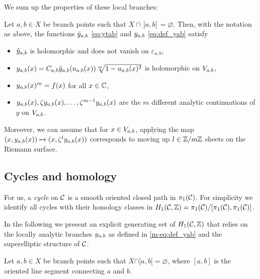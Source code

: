 \documentclass[main.tex]{subfiles}
\begin{document}
We sum up the properties of these local branches:

 \begin{prop}\label{prop:yab}
      Let $a,b\in X$ be branch points such that $X\cap\,]a,b[\,=\varnothing$.
      Then, with the notation as above, the functions
      $\tilde{y}_{a,b}$ \eqref{eq:ytab} and $y_{a,b}$ \eqref{eq:def_yab}
      satisfy
     \begin{itemize}
         \item $\tilde{y}_{a,b}$ is holomorphic and does not vanish on $ε_{a,b}$,
         \item $y_{a,b}(x) = C_{a,b} \tilde{y}_{a,b}(u_{a,b}(x)) \sqrt[m]{1-u_{a,b}(x)^2}$ is holomorphic
         on $V_{a,b}$,
         \item $y_{a,b}(x)^m = f(x)$ for all $x\in\mathbb{C}$,
         \item $y_{a,b}(x),\zeta y_{a,b}(x),\dots,\zeta^{m-1}y_{a,b}(x)$ are the $m$ different analytic continuations of $y$ on $V_{a,b}$.
     \end{itemize}
     Moreover, we can assume that for $x \in V_{a,b}$, applying the map $(x,y_{a,b}(x)) \mapsto (x,\zeta^ly_{a,b}(x))$ corresponds to moving up $l \in \mathbb{Z}/m\mathbb{Z}$ sheets on the Riemann surface.
 \end{prop}

 \subsection{Cycles and homology}\label{subsec:cycles_homo}

   For us, a \emph{cycle} on $\mathcal{C}$ is a smooth oriented closed path in $\pi_1(\mathcal{C})$.
   For simplicity we identify all cycles with their homology classes in $H_1(\mathcal{C},\mathbb{Z}) = \pi_1(\mathcal{C})/[\pi_1(\mathcal{C}),\pi_1(\mathcal{C})]$.

   In the following we present an
   explicit generating set of $H_1(\mathcal{C},\mathbb{Z})$ that relies on the locally analytic branches $y_{a,b}$ as defined in \eqref{m-eq:def_yab} and the superelliptic structure of $\mathcal{C}$.

   Let $a, b \in X$ be branch points such that $X\cap]a,b[=\varnothing$, where  $[a,b]$ is the oriented line segment connecting $a$ and $b$.
\end{document}
